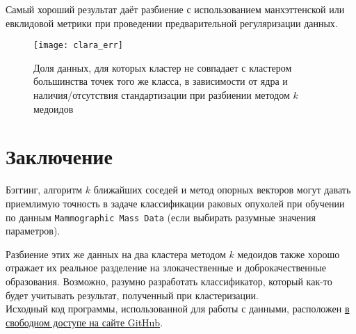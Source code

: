 \documentclass[a4paper,12pt]{article} %
\newcommand{\myPictWidth}{\textwidth}
\begin{document}
Самый хороший результат даёт разбиение с использованием манхэттенской или евклидовой метрики при проведении предварительной регуляризации данных.

\begin{figure}[H]
    \centering \texttt{[image: clara\_err]}
    \caption{Доля данных, для которых кластер не совпадает с кластером большинства точек того же класса, в зависимости от ядра и наличия/отсутствия стандартизации при разбиении методом $ k $ медоидов}
    \label{fig:clara}
\end{figure}

\newpage
\section{Заключение}

Бэггинг, алгоритм $ k $ ближайших соседей и метод опорных векторов могут давать приемлимую точность в задаче классификации раковых опухолей при обучении по данным \texttt{Mammographic Mass Data} (если выбирать разумные значения параметров).

Разбиение этих же данных на два кластера методом $ k $ медоидов также хорошо отражает их реальное разделение на злокачественные и доброкачественные образования. Возможно, разумно разработать классификатор, который как-то будет учитывать результат, полученный при кластеризации. \\

Исходный код программы, использованной для работы с данными, расположен \href{https://github.com/zuevval/source/tree/master/r/ml/finale}{в свободном доступе на сайте GitHub}.
\end{document}
